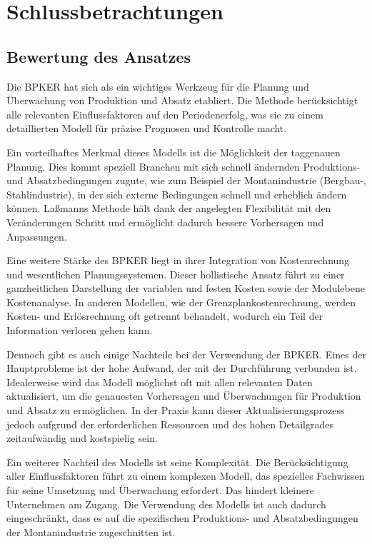 \chapter{Schlussbetrachtungen}

\section{Bewertung des Ansatzes}

Die BPKER hat sich als ein wichtiges Werkzeug für die Planung und Überwachung von Produktion und Absatz etabliert. Die Methode berücksichtigt alle relevanten Einflussfaktoren auf den Periodenerfolg, was sie zu einem detaillierten Modell für präzise Prognosen und Kontrolle macht.

Ein vorteilhaftes Merkmal dieses Modells ist die Möglichkeit der taggenauen Planung. Dies kommt speziell Branchen mit sich schnell ändernden Produktions- und Absatzbedingungen zugute, wie zum Beispiel der Montanindustrie (Bergbau-, Stahlindustrie), in der sich externe Bedingungen schnell und erheblich ändern können. La{\ss}manns Methode hält dank der angelegten Flexibilität mit den Veränderungen Schritt und ermöglicht dadurch bessere Vorhersagen und Anpassungen.

Eine weitere Stärke des BPKER liegt in ihrer Integration von Kostenrechnung und wesentlichen Planungssystemen. Dieser hollistische Ansatz führt zu einer ganzheitlichen Darstellung der variablen und festen Kosten sowie der Modulebene Kostenanalyse. In anderen Modellen, wie der Grenzplankostenrechnung, werden Kosten- und Erlösrechnung oft getrennt behandelt, wodurch ein Teil der Information verloren gehen kann.

Dennoch gibt es auch einige Nachteile bei der Verwendung der BPKER. Eines der Hauptprobleme ist der hohe Aufwand, der mit der Durchführung verbunden ist. Idealerweise wird das Modell möglichst oft mit allen relevanten Daten aktualisiert, um die genauesten Vorhersagen und Überwachungen für Produktion und Absatz zu ermöglichen. In der Praxis kann dieser Aktualisierungsprozess jedoch aufgrund der erforderlichen Ressourcen und des hohen Detailgrades zeitaufwändig und kostspielig sein.

Ein weiterer Nachteil des Modells ist seine Komplexität. Die Berücksichtigung aller Einflussfaktoren führt zu einem komplexen Modell, das spezielles Fachwissen für seine Umsetzung und Überwachung erfordert. Das hindert kleinere Unternehmen am Zugang. Die Verwendung des Modells ist auch dadurch eingeschränkt, dass es auf die spezifischen Produktions- und Absatzbedingungen der Montanindustrie zugeschnitten ist.

